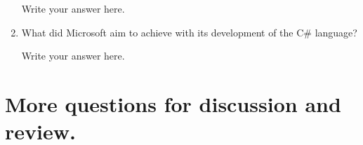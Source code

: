 \begin{enumerate}
  \begin{answer}

    Write your answer here.

    \end{answer}

  \item What did Microsoft aim to achieve with its development of the
    C\# language?

  \begin{answer}

    Write your answer here.

    \end{answer}

  \end{enumerate}





\section{More questions for discussion and review.}

